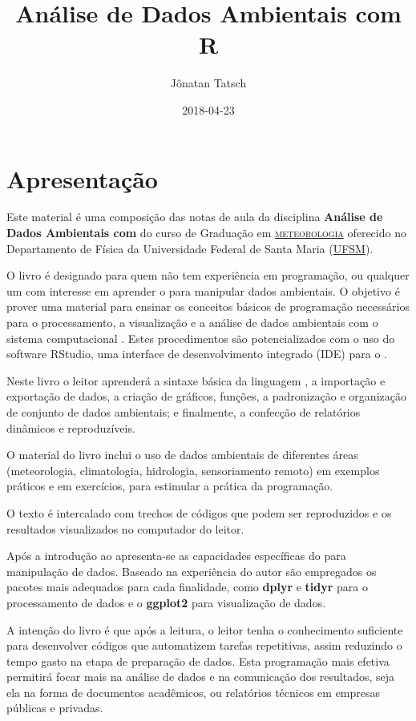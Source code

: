 \documentclass[]{book}
\title{Análise de Dados Ambientais com R}
\author{Jônatan Tatsch}
\date{2018-04-23}
\begin{document}
\maketitle

{
\setcounter{tocdepth}{1}
\tableofcontents
}
\chapter*{Apresentação}\label{apresentacao}

Este material é uma composição das notas de aula da disciplina
\textbf{Análise de Dados Ambientais com } do curso de Graduação em
\href{http://w3.ufsm.br/meteorologia/}{\textsc{meteorologia}} oferecido
no Departamento de Física da Universidade Federal de Santa Maria
(\href{http://site.ufsm.br/}{UFSM}).

O livro é designado para quem não tem experiência em programação, ou
qualquer um com interesse em aprender o para manipular dados ambientais.
O objetivo é prover uma material para ensinar os conceitos básicos de
programação necessários para o processamento, a visualização e a análise
de dados ambientais com o sistema computacional . Estes procedimentos
são potencializados com o uso do software RStudio, uma interface de
desenvolvimento integrado (IDE) para o .

Neste livro o leitor aprenderá a sintaxe básica da linguagem
\citep{R-base}, a importação e exportação de dados, a criação de
gráficos, funções, a padronização e organização de conjunto de dados
ambientais; e finalmente, a confecção de relatórios dinâmicos e
reproduzíveis.

O material do livro inclui o uso de dados ambientais de diferentes áreas
(meteorologia, climatologia, hidrologia, sensoriamento remoto) em
exemplos práticos e em exercícios, para estimular a prática da
programação.

O texto é intercalado com trechos de códigos que podem ser reproduzidos
e os resultados visualizados no computador do leitor.

Após a introdução ao apresenta-se as capacidades específicas do para
manipulação de dados. Baseado na experiência do autor são empregados os
pacotes mais adequados para cada finalidade, como \textbf{dplyr} e
\textbf{tidyr} para o processamento de dados e o \textbf{ggplot2} para
visualização de dados.

A intenção do livro é que após a leitura, o leitor tenha o conhecimento
suficiente para desenvolver códigos que automatizem tarefas repetitivas,
assim reduzindo o tempo gasto na etapa de preparação de dados. Esta
programação mais efetiva permitirá focar mais na análise de dados e na
comunicação dos resultados, seja ela na forma de documentos acadêmicos,
ou relatórios técnicos em empresas públicas e privadas.
\end{document}
